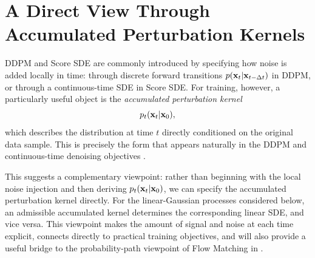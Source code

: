 
\clearpage
\newpage


\section{\texorpdfstring{A Direct View Through Accumulated Perturbation Kernels}{A Direct View Through Accumulated Perturbation Kernels}}
\label{sec:variational-perspective}

DDPM and Score SDE are commonly introduced by specifying how noise is added
locally in time: through discrete forward transitions
$p({\mathbf{x}}_t|{\mathbf{x}}_{t-\Delta t})$ in DDPM, or through a continuous-time SDE in
Score SDE. For training, however, a particularly useful object is the
\emph{accumulated perturbation kernel}
\[
p_t({\mathbf{x}}_t|{\mathbf{x}}_0),
\]
which describes the distribution at time $t$ directly conditioned on the
original data sample. This is precisely the form that appears naturally in
the DDPM and continuous-time denoising objectives
.

This suggests a complementary viewpoint: rather than beginning with the local
noise injection and then deriving $p_t({\mathbf{x}}_t|{\mathbf{x}}_0)$, we can specify the
accumulated perturbation kernel directly. For the linear-Gaussian processes
considered below, an admissible accumulated kernel determines the corresponding
linear SDE, and vice versa. This viewpoint makes the amount of signal and noise
at each time explicit, connects directly to practical training objectives, and
will also provide a useful bridge to the probability-path viewpoint of Flow
Matching in .

